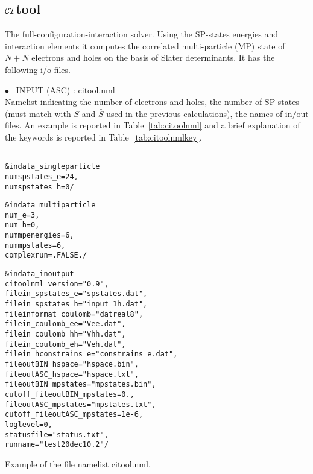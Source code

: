 \documentclass[12pt,twoside]{article}
\newcommand*{\CItool}[0]{{$\cal CI$}\textsf{tool} }
\begin{document}

\subsection*{\CItool}
%
The full-configuration-interaction solver.  Using the SP-states
energies and interaction elements it computes the correlated
multi-particle (MP) state of $N+\bar N$ electrons and holes on the basis of
Slater determinants.  It has the following i/o files.

$\bullet$ \ \textsf{INPUT (ASC) : citool.nml} \\
Namelist indicating the number of electrons and holes, the
number of SP states (must match with $S$ and $\bar S$ used in
the previous calculations), the names of in/out files.
An example is reported in Table~\ref{tab:citoolnml} and a brief
explanation of the keywords is reported in Table~\ref{tab:citoolnmlkey}.

\begin{table}
\begin{alltt}
\ \\
 &indata_singleparticle
                 numspstates_e= 24 ,
                 numspstates_h= 0            /

 &indata_multiparticle
                 num_e= 3 ,
                 num_h= 0 ,
                 nummpenergies= 6 ,
                 nummpstates= 6 ,
                 complexrun= .FALSE.              /


 &indata_inoutput
                 citoolnml_version= "0.9" ,
                 filein_spstates_e= "spstates.dat" ,
                 filein_spstates_h= "input_1h.dat" ,
                 fileinformat_coulomb= "dat real8" ,
                 filein_coulomb_ee= "Vee.dat" ,
                 filein_coulomb_hh= "Vhh.dat" ,
                 filein_coulomb_eh= "Veh.dat" ,
                 filein_hconstrains_e = "constrains_e.dat" ,
                 fileoutBIN_hspace= "hspace.bin" ,
                 fileoutASC_hspace= "hspace.txt" ,
                 fileoutBIN_mpstates= "mpstates.bin" ,
                 cutoff_fileoutBIN_mpstates = 0. ,
                 fileoutASC_mpstates= "mpstates.txt" ,
                 cutoff_fileoutASC_mpstates = 1e-6 ,
                 loglevel= 0 ,
                 statusfile= "status.txt",
                 runname= "test20dec10.2"             /
\end{alltt}
\caption{Example of the file namelist \textsf{citool.nml}.} 
\label{tab:citoolnml}
\end{table}
\end{document}
